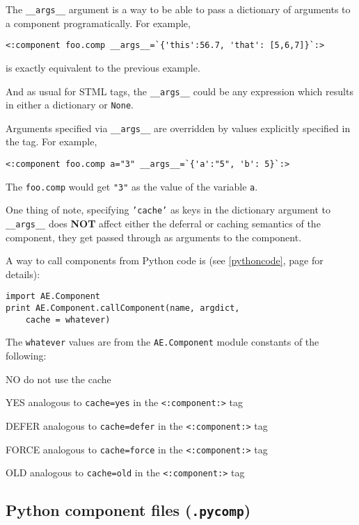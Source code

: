 \documentclass{manual}
\begin{document}
The \texttt{__args__} argument is a way to be able to pass a
dictionary of arguments to a component programatically.  For example,
\begin{verbatim}
<:component foo.comp __args__=`{'this':56.7, 'that': [5,6,7]}`:>
\end{verbatim}
is exactly equivalent to the previous example. 

And as usual for STML tags, the \texttt{__args__} could be any
expression which results in either a dictionary or \texttt{None}.

Arguments specified via \texttt{__args__} are overridden by values
explicitly specified in the tag.  For example,
\begin{verbatim}
<:component foo.comp a="3" __args__=`{'a':"5", 'b': 5}`:>
\end{verbatim}
The \texttt{foo.comp} would get \texttt{"3"} as the value of the
variable \texttt{a}.

One thing of note, specifying \texttt{'cache'} as keys in the
dictionary argument to \texttt{__args__} does \textbf{NOT} affect
either the deferral or caching semantics of the component, they get
passed through as arguments to the component.

A way to call components from Python code is (see \ref{pythoncode},
page \pageref{pythoncode} for details):
\begin{verbatim}
import AE.Component
print AE.Component.callComponent(name, argdict, 
	cache = whatever)
\end{verbatim}
The \texttt{whatever} values are from the \texttt{AE.Component} module constants of the following:
\label{whatevervals}
\begin{argdesc}
\item[NO] do not use the cache
\item[YES] analogous to \texttt{cache=yes} in the \texttt{<:component:>} tag
\item[DEFER] analogous to \texttt{cache=defer} in the
\texttt{<:component:>} tag
\item[FORCE] analogous to \texttt{cache=force} in the
\texttt{<:component:>} tag
\item[OLD] analogous to \texttt{cache=old} in the
\texttt{<:component:>} tag
\end{argdesc}

\subsection{Python component files (\texttt{.pycomp})}
\end{document}

